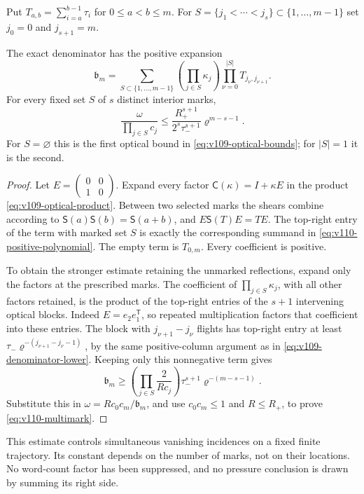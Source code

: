 Put $T_{a,b}=\sum_{i=a}^{b-1}\tau_i$ for $0\le a<b\le m$.
For $S=\{j_1<\cdots<j_s\}\subset\{1,\ldots,m-1\}$ set
$j_0=0$ and $j_{s+1}=m$.

\begin{proposition}
\label{prop:v110-multimark}
The exact denominator has the positive expansion
\begin{equation}\label{eq:v110-positive-polynomial}
 \mathfrak b_m=
 \sum_{S\subset\{1,\ldots,m-1\}}
       \left(\prod_{j\in S}\kappa_j\right)
       \prod_{\nu=0}^{|S|}T_{j_\nu,j_{\nu+1}}.
\end{equation}
For every fixed set $S$ of $s$ distinct interior marks,
\begin{equation}\label{eq:v110-multimark}
 \frac{\omega}{\prod_{j\in S}c_j}
 \le \frac{R_+^{s+1}}{2^s\tau_-^{s+1}}
                       \varrho^{m-s-1}.
\end{equation}
For $S=\varnothing$ this is the first optical bound in
\eqref{eq:v109-optical-bounds}; for $|S|=1$ it is the second.
\end{proposition}
\begin{proof}
Let $E=\left(\begin{smallmatrix}0&0\\1&0\end{smallmatrix}\right)$.
Expand every factor $\mathsf C(\kappa)=I+\kappa E$ in the product
\eqref{eq:v109-optical-product}. Between two selected marks the
shears combine according to
$\mathsf S(a)\mathsf S(b)=\mathsf S(a+b)$, and
$E\mathsf S(T)E=TE$. The top-right entry of the term with marked
set $S$ is exactly the corresponding summand in
\eqref{eq:v110-positive-polynomial}. The empty term is
$T_{0,m}$. Every coefficient is positive.

To obtain the stronger estimate retaining the unmarked reflections,
expand only the factors at the prescribed marks. The coefficient of
$\prod_{j\in S}\kappa_j$, with all other factors retained, is the
product of the top-right entries of the $s+1$ intervening optical
blocks. Indeed $E=e_2e_1^{\mathsf T}$, so repeated multiplication
factors that coefficient into these entries. The block with
$j_{\nu+1}-j_\nu$ flights has top-right entry at least
$\tau_-\varrho^{-(j_{\nu+1}-j_\nu-1)}$, by the same positive-column
argument as in \eqref{eq:v109-denominator-lower}.
Keeping only this nonnegative term gives
\[
 \mathfrak b_m\ge
 \left(\prod_{j\in S}\frac{2}{Rc_j}\right)
            \tau_-^{s+1}\varrho^{-(m-s-1)}.
\]
Substitute this in $\omega=Rc_0c_m/\mathfrak b_m$, and use
$c_0c_m\le1$ and $R\le R_+$, to prove
\eqref{eq:v110-multimark}.
\end{proof}
This estimate controls simultaneous vanishing incidences on a fixed
finite trajectory. Its constant depends on the number of marks,
not on their locations. No word-count factor has been suppressed,
and no pressure conclusion is drawn by summing its right side.

